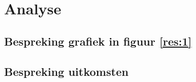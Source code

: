 \documentclass{report}
\begin{document}
\section{Analyse}
\subsection{Bespreking grafiek in figuur \ref{res:1}}

\subsection{Bespreking uitkomsten}
\end{document}
